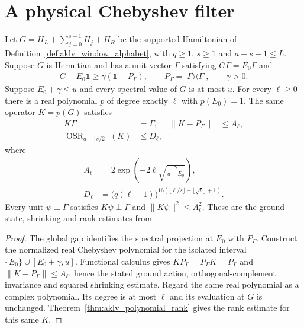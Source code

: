 \section{A physical Chebyshev filter}

\begin{theorem}
    \label{thm:aklv_physical_chebyshev_filter}
    \leanok
    Let $G=H_L+\sum_{j=0}^{s-1}H_j+H_R$ be the supported Hamiltonian of
    Definition~\ref{def:aklv_window_alphabet}, with $q\ge1$, $s\ge1$ and
    $a+s+1\le L$. Suppose $G$ is Hermitian and has a unit vector $\Gamma$
    satisfying $G\Gamma=E_0\Gamma$ and
    \begin{align*}
        G-E_0\mathbb 1\ge\gamma(\mathbb 1-P_\Gamma),\qquad
        P_\Gamma=|\Gamma\rangle\langle\Gamma|,\qquad\gamma>0.
    \end{align*}
    Suppose $E_0+\gamma\le u$ and every spectral value of $G$ is at most $u$.
    For every $\ell\ge0$ there is a real polynomial $p$ of degree exactly $\ell$
    with $p(E_0)=1$. The same operator $K=p(G)$ satisfies
    \begin{align*}
        K\Gamma                                      & =\Gamma,    & \|K-P_\Gamma\| & \le A_\ell, \\
        \operatorname{OSR}_{a+\lfloor s/2\rfloor}(K) & \le D_\ell,
    \end{align*}
    where
    \begin{align*}
        A_\ell & =2\exp\left(-2\ell\sqrt{\frac{\gamma}{u-E_0}}\right), \\
        D_\ell & =\bigl(q(\ell+1)\bigr)^{
                16(\lfloor\ell/s\rfloor+\lfloor\sqrt\ell\rfloor+1)}.
    \end{align*}
    Every unit $\psi\perp\Gamma$ satisfies $K\psi\perp\Gamma$ and
    $\|K\psi\|^2\le A_\ell^2$.
    These are the ground-state, shrinking and rank estimates from
    \cite[Section~4, Lemmas~4.1 and 4.2]{Arad2013AreaLaw}.
\end{theorem}
\begin{proof}
    \leanok
    The global gap identifies the spectral projection at $E_0$ with
    $P_\Gamma$. Construct the normalized real Chebyshev
    polynomial for the isolated interval $\{E_0\}\cup[E_0+\gamma,u]$.
    Functional calculus gives $KP_\Gamma=P_\Gamma K=P_\Gamma$ and
    $\|K-P_\Gamma\|\le A_\ell$, hence the stated ground action,
    orthogonal-complement invariance and squared shrinking estimate.
    Regard the same real polynomial as a complex polynomial. Its degree is
    at most $\ell$ and its evaluation at $G$ is unchanged.
    Theorem~\ref{thm:aklv_polynomial_rank} gives the rank estimate for this same $K$.
\end{proof}

